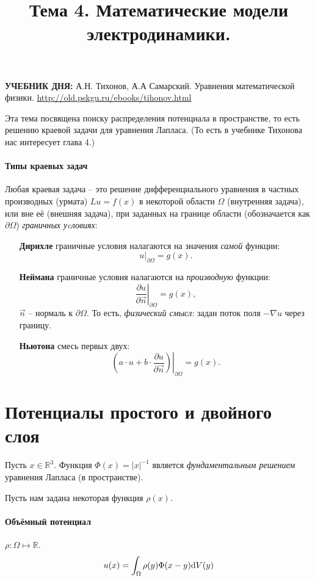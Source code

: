 \documentclass[12pt]{report}
\title{Тема 4. Математические модели электродинамики.}
\begin{document}
	\maketitle

\begin{tcolorbox}
	\textbf{УЧЕБНИК ДНЯ:}
	А.Н. Тихонов, А.А Самарский. Уравнения математической физики.
	\url{http://old.pskgu.ru/ebooks/tihonov.html}
\end{tcolorbox}

Эта тема посвящена поиску распределения потенциала в пространстве, то есть решению краевой задачи для уравнения Лапласа. (То есть в учебнике Тихонова нас интересует глава 4.)

\paragraph{Типы краевых задач}
Любая краевая задача -- это решение дифференциального уравнения в частных производных (урмата) $Lu = f(x)$ в некоторой области $\Omega$ (внутренняя задача), или вне её (внешняя задача), при заданных на границе области (обозначается как $\partial\Omega$) \emph{граничных уcловиях}:
\begin{enumerate}[(1)]
	\item[\textbf{Дирихле}] граничные условия налагаются на значения \emph{самой} функции: 
	\[
		u\vert_{\partial\Omega}=g(x).
	\]
	\item[\textbf{Неймана}] граничные условия налагаются на \emph{производную} функции: 
	\[
		\left.\frac{\partial u}{\partial\vec n}\right\vert_{\partial\Omega} = g(x),
	\]
	$\vec n$ -- нормаль к $\partial\Omega$. То есть, \emph{физический смысл}: задан поток поля $-\nabla u$ через границу.
	\item[\textbf{Ньютона}] смесь первых двух: 
	\[
		\left.\left(a\cdot u + b\cdot \frac{\partial u}{\partial\vec n}\right)\right\vert_{\partial\Omega} = g(x).
	\]
\end{enumerate}

\section{Потенциалы простого и двойного слоя}
Пусть $x\in\mathbb{R}^3$.
Функция $\Phi(x) = |x|^{-1}$ является \emph{фундаментальным решением} уравнения Лапласа (в пространстве).~\cite[стр.~282]{Tikhonov}

Пусть нам задана некоторая функция $\rho(x)$.
\paragraph{Объёмный потенциал}
$\rho: \Omega \mapsto \mathbb{R}$.
\begin{equation}
	u(x) = \int_\Omega \rho(y)\Phi(x-y)\mathrm d V(y)
\end{equation}
\end{document}
